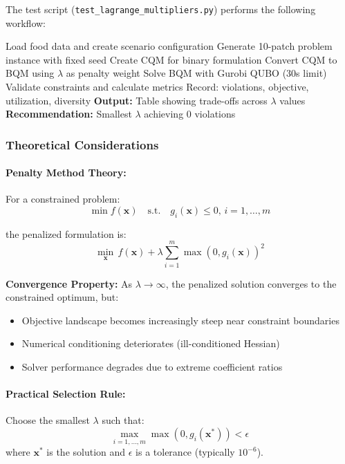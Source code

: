 \documentclass{oqireport}
\begin{document}
The test script (\texttt{test\_lagrange\_multipliers.py}) performs the following workflow:

\begin{algorithm}[H]
\caption{Lagrange Multiplier Sensitivity Analysis}
\begin{algorithmic}[1]
\State Load food data and create scenario configuration
\State Generate 10-patch problem instance with fixed seed
\State Create CQM for binary formulation
    \State Convert CQM to BQM using $\lambda$ as penalty weight
    \State Solve BQM with Gurobi QUBO (30s limit)
    \State Validate constraints and calculate metrics
    \State Record: violations, objective, utilization, diversity
\EndFor
\State \textbf{Output:} Table showing trade-offs across $\lambda$ values
\State \textbf{Recommendation:} Smallest $\lambda$ achieving 0 violations
\end{algorithmic}
\end{algorithm}

\subsubsection{Theoretical Considerations}

\paragraph{Penalty Method Theory:} For a constrained problem:
$$\min f(\mathbf{x}) \quad \text{s.t.} \quad g_i(\mathbf{x}) \leq 0, \, i=1,\ldots,m$$

the penalized formulation is:
$$\min_{\mathbf{x}} \, f(\mathbf{x}) + \lambda \sum_{i=1}^m \max(0, g_i(\mathbf{x}))^2$$

\textbf{Convergence Property:} As $\lambda \to \infty$, the penalized solution converges to the constrained optimum, but:
\begin{itemize}
    \item Objective landscape becomes increasingly steep near constraint boundaries
    \item Numerical conditioning deteriorates (ill-conditioned Hessian)
    \item Solver performance degrades due to extreme coefficient ratios
\end{itemize}

\paragraph{Practical Selection Rule:} Choose the smallest $\lambda$ such that:
$$\max_{i=1,\ldots,m} \max(0, g_i(\mathbf{x}^*)) < \epsilon$$
where $\mathbf{x}^*$ is the solution and $\epsilon$ is a tolerance (typically $10^{-6}$).
\end{document}
